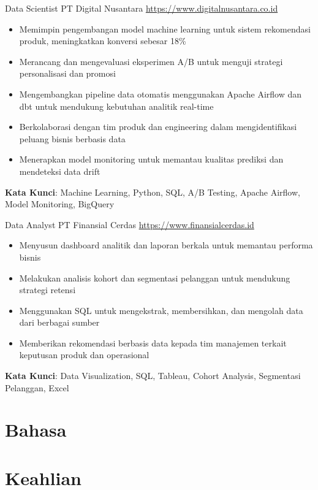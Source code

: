 \documentclass[a4paper, serif, 10pt]{moderncv}
\begin{document}
        {Data Scientist}
        {PT Digital Nusantara}
        {\url{https://www.digitalnusantara.co.id}}
        {}
        {\begin{itemize}
\item Memimpin pengembangan model machine learning untuk sistem rekomendasi produk, meningkatkan konversi sebesar 18\%
\item Merancang dan mengevaluasi eksperimen A/B untuk menguji strategi personalisasi dan promosi
\item Mengembangkan pipeline data otomatis menggunakan Apache Airflow dan dbt untuk mendukung kebutuhan analitik real-time
\item Berkolaborasi dengan tim produk dan engineering dalam mengidentifikasi peluang bisnis berbasis data
\item Menerapkan model monitoring untuk memantau kualitas prediksi dan mendeteksi data drift
\end{itemize}
\textbf{Kata Kunci}: Machine Learning, Python, SQL, A/B Testing, Apache Airflow, Model Monitoring, BigQuery}

        {Data Analyst}
        {PT Finansial Cerdas}
        {\url{https://www.finansialcerdas.id}}
        {}
        {\begin{itemize}
\item Menyusun dashboard analitik dan laporan berkala untuk memantau performa bisnis
\item Melakukan analisis kohort dan segmentasi pelanggan untuk mendukung strategi retensi
\item Menggunakan SQL untuk mengekstrak, membersihkan, dan mengolah data dari berbagai sumber
\item Memberikan rekomendasi berbasis data kepada tim manajemen terkait keputusan produk dan operasional
\end{itemize}
\textbf{Kata Kunci}: Data Visualization, SQL, Tableau, Cohort Analysis, Segmentasi Pelanggan, Excel}
\section{Bahasa}

\section{Keahlian}
\end{document}
